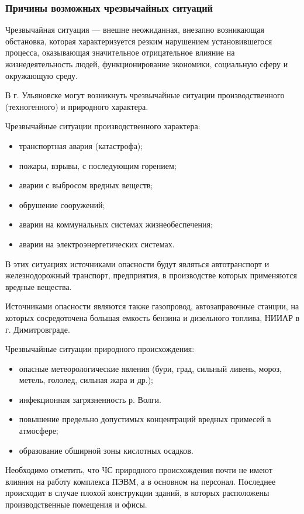 \subsubsection{Причины возможных чрезвычайных ситуаций}
Чрезвычайная ситуация --- внешне неожиданная, внезапно возникающая обстановка, которая характеризуется резким нарушением установившегося процесса, оказывающая значительное отрицательное влияние на жизнедеятельность людей, функционирование экономики, социальную сферу и окружающую среду.

В г. Ульяновске могут возникнуть чрезвычайные ситуации производственного (техногенного) и природного характера.

Чрезвычайные ситуации производственного характера:
\begin{itemize}
  \item транспортная авария (катастрофа);
  \item пожары, взрывы, с последующим горением;
  \item аварии с выбросом вредных веществ;
  \item обрушение сооружений;
  \item аварии на коммунальных системах жизнеобеспечения;
  \item аварии на электроэнергетических системах.
\end{itemize}

В этих ситуациях источниками опасности будут являться автотранспорт и железнодорожный транспорт, предприятия, в производстве которых применяются вредные вещества.

Источниками опасности являются также газопровод, автозаправочные станции, на которых сосредоточена большая емкость бензина и дизельного топлива, НИИАР в г. Димитровграде.

Чрезвычайные ситуации природного происхождения:
\begin{itemize}
  \item опасные метеорологические явления (бури, град, сильный ливень, мороз, метель, гололед, сильная жара и др.);
  \item инфекционная загрязненность р. Волги.
  \item повышение предельно допустимых концентраций вредных примесей в атмосфере;
  \item образование обширной зоны кислотных осадков.
\end{itemize}

Необходимо отметить, что ЧС природного происхождения почти не имеют влияния на работу комплекса ПЭВМ, а в основном на персонал.
Последнее происходит в случае плохой конструкции зданий, в которых расположены производственные помещения и офисы.

